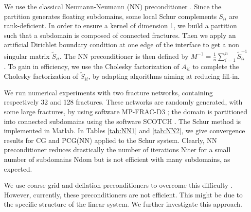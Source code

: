 \documentclass{report}
\begin{document}
We use the classical Neumann-Neumann (NN) preconditioner
\cite{carv01,tos05}. Since the partition generates floating subdomains,
some local Schur complements $S_{ii}$ are rank-deficient. In order to
ensure a kernel of dimension 1, we build a partition such that a
subdomain is composed of connected fractures. Then we apply an artificial
Dirichlet boundary condition at one edge of the interface to get a non
singular matrix $\tilde{S}_{ii}$. The NN preconditioner is then defined
by $M^{-1}=\frac{1}{n}\sum_{i=1}^{n} \tilde{S}_{ii}^{-1}$. To gain in
efficiency, we use the Cholesky factorization of $A_{ii}$ to complete the
Cholesky factorization of $\tilde{S}_{ii}$, by adapting algorithms aiming
at reducing fill-in.

We run numerical experiments with two fracture networks, containing
respectively 32 and 128 fractures. These networks are randomly generated,
with some large fractures, by using software MP-FRAC-D3 \cite{erhe09b};
the domain is partitioned into connected subdomains using the software
SCOTCH \cite{pell08}. The Schur method is implemented in Matlab.
In Tables \ref{tab:NN1} and \ref{tab:NN2}, we give convergence results
for CG and PCG(NN) applied to the Schur system. Clearly, NN
preconditioner reduces drastically the number of iterations Niter for a
small number of subdomains Ndom but is not efficient with many
subdomains, as expected.

We use coarse-grid and deflation preconditioners to overcome this
difficulty \cite{erhe00b,nab04}. However, currently, these
preconditioners are not efficient. This might be due to the specific
structure of the linear system. We further investigate this approach.
\end{document}

